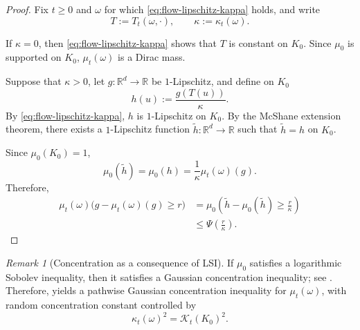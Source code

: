 \documentclass{tsp-short}
\theoremstyle{remark}
\newtheorem{remark}{Remark}[section]
\theoremstyle{definition}
\newcommand{\R}{\mathbb{R}} %
\begin{document}
\begin{proof}
	Fix \(t\ge0\) and \(\omega\) for which
	\eqref{eq:flow-lipschitz-kappa} holds, and write
	\begin{equation*}
		T:=T_t(\omega,\cdot), \qquad \kappa:=\kappa_t(\omega).
	\end{equation*}

	If \(\kappa=0\), then \eqref{eq:flow-lipschitz-kappa} shows that \(T\) is constant
	on \(K_0\). Since \(\mu_0\) is supported on \(K_0\), \(\mu_t(\omega)\) is a Dirac mass.

	Suppose that \(\kappa>0\), let \(g:\R^d\to\R\) be \(1\)-Lipschitz, and define on \(K_0\)
	\begin{equation*}
		h(u):=\frac{g(T(u))}{\kappa}.
	\end{equation*}
	By \eqref{eq:flow-lipschitz-kappa}, \(h\) is \(1\)-Lipschitz on \(K_0\). By the McShane extension theorem, there exists a
	\(1\)-Lipschitz function \(\widetilde h:\R^d\to\R\) such that \(\widetilde h=h\) on \(K_0\).

	Since \(\mu_0(K_0)=1\),
	\begin{equation*}
		\mu_0(\widetilde h)=\mu_0(h)=\frac{1}{\kappa}\mu_t(\omega)(g).
	\end{equation*}
	Therefore,
	\begin{align*}
		\mu_t(\omega)\bigl(g-\mu_t(\omega)(g)\ge r\bigr) & = \mu_0\left(\widetilde h-\mu_0(\widetilde h)\ge\frac{r}{\kappa}\right) \\
		                                                 & \le \Psi\left(\frac{r}{\kappa}\right).
	\end{align*}
\end{proof}

\begin{remark}[Concentration as a consequence of LSI]
	If \(\mu_0\) satisfies a logarithmic Sobolev inequality, then it satisfies a Gaussian concentration inequality; see
	\cite[Chapter~5]{ledoux2001concentration}. Therefore,  yields a pathwise Gaussian concentration inequality for
	\(\mu_t(\omega)\), with random concentration
	constant controlled by
	\begin{equation*}
		\kappa_t(\omega)^2=\mathcal K_t(K_0)^2.
	\end{equation*}
\end{remark}
\end{document}
